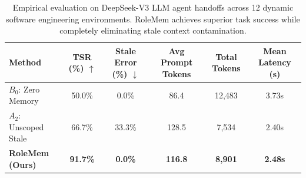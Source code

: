 \begin{table}[t]
\centering
\caption{Empirical evaluation on DeepSeek-V3 LLM agent handoffs across 12 dynamic software engineering environments. RoleMem achieves superior task success while completely eliminating stale context contamination.}
\label{tab:main_results}
\begin{tabular}{lccccc}
\toprule
\textbf{Method} & \textbf{TSR (\%) $\uparrow$} & \textbf{Stale Error (\%) $\downarrow$} & \textbf{Avg Prompt Tokens} & \textbf{Total Tokens} & \textbf{Mean Latency (s)} \\
\midrule
$B_0$: Zero Memory & 50.0\% & 0.0\% & 86.4 & 12,483 & 3.73s \\
$A_2$: Unscoped Stale & 66.7\% & 33.3\% & 128.5 & 7,534 & 2.40s \\
\textbf{RoleMem (Ours)} & \textbf{91.7\%} & \textbf{0.0\%} & \textbf{116.8} & \textbf{8,901} & \textbf{2.48s} \\
\bottomrule
\end{tabular}
\end{table}
